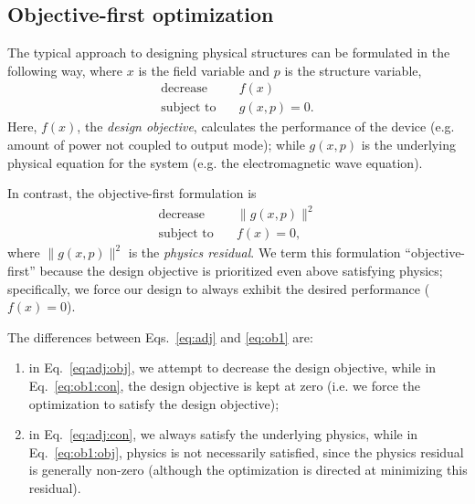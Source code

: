 \documentclass[letterpaper,10pt]{article}
\begin{document}
\subsection{Objective-first optimization}
The typical approach to designing physical structures can be formulated 
    in the following way, 
    where $x$ is the field variable and $p$ is the structure variable,
    \begin{subequations}\label{eq:adj}
    \begin{align} 
    \text{decrease} & \quad f(x) \label{eq:adj:obj} \\ 
    \text{subject to} & \quad g(x,p) = 0. \label{eq:adj:con}
    \end{align}
    \end{subequations}
Here, $f(x)$, the \emph{design objective}, 
    calculates the performance of the device 
    (e.g. amount of power not coupled to output mode); 
    while $g(x,p)$ is the underlying physical equation for the system
    (e.g. the electromagnetic wave equation).

In contrast, the objective-first formulation is
    \begin{subequations}\label{eq:ob1}
    \begin{align} 
    \text{decrease} & \quad \|g(x,p)\|^2 \label{eq:ob1:obj} \\ 
    \text{subject to} & \quad f(x) = 0, \label{eq:ob1:con}
    \end{align}
    \end{subequations}
    where $\|g(x,p)\|^2$ is the \emph{physics residual}.
We term this formulation ``objective-first''
    because the design objective is prioritized even above satisfying physics;
    specifically, we force our design to always exhibit the desired performance
    ($f(x) = 0$).

The differences between Eqs.~\ref{eq:adj} and \ref{eq:ob1} are:
\begin{enumerate}
    \item in Eq.~\ref{eq:adj:obj}, we attempt to decrease the design objective,
        while in Eq.~\ref{eq:ob1:con}, the design objective is kept at zero
        (i.e. we force the optimization to satisfy the design objective);
    \item in Eq.~\ref{eq:adj:con}, we always satisfy the underlying physics,
        while in Eq.~\ref{eq:ob1:obj}, physics is not necessarily satisfied,
            since the physics residual is generally non-zero
            (although the optimization is directed at minimizing this residual).
\end{enumerate}
\end{document}
